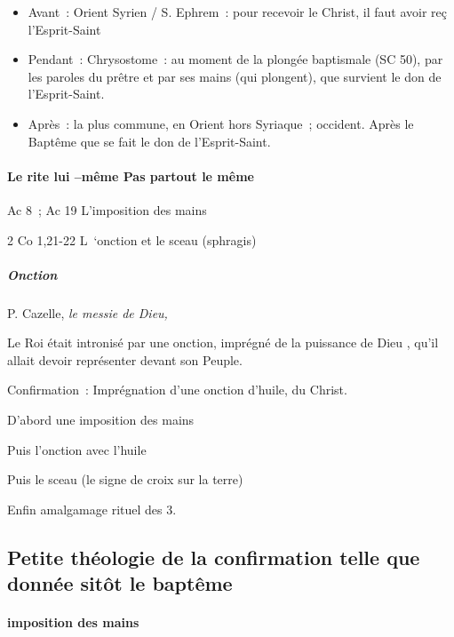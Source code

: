 \begin{itemize}
\item
  Avant~: Orient Syrien / S. Ephrem~: pour recevoir le Christ, il faut
  avoir reç l'Esprit-Saint
\item
  Pendant~: Chrysostome~: au moment de la plongée baptismale (SC 50),
  par les paroles du prêtre et par ses mains (qui plongent), que
  survient le don de l'Esprit-Saint.
\item
  Après~: la plus commune, en Orient hors Syriaque~; occident. Après le
  Baptême que se fait le don de l'Esprit-Saint.
\end{itemize}

\hypertarget{le-rite-lui-muxeame-pas-partout-le-muxeame}{%
\paragraph{Le rite lui --même Pas partout le
même}\label{le-rite-lui-muxeame-pas-partout-le-muxeame}}

Ac 8~; Ac 19 L'imposition des mains

 
2 Co 1,21-22 L~`onction et le sceau (sphragis)
 

\hypertarget{onction}{%
\subparagraph{Onction}\label{onction}}

P. Cazelle, \emph{le messie de Dieu,}

Le Roi était intronisé par une onction, imprégné de la puissance de Dieu
, qu'il allait devoir représenter devant son Peuple.

Confirmation~: Imprégnation d'une onction d'huile, du Christ.

D'abord une imposition des mains

Puis l'onction avec l'huile

Puis le sceau (le signe de croix sur la terre)

Enfin amalgamage rituel des 3.

\hypertarget{petite-thuxe9ologie-de-la-confirmation-telle-que-donnuxe9e-situxf4t-le-baptuxeame}{%
\subsection{Petite théologie de la confirmation telle que donnée
sitôt le
baptême}\label{petite-thuxe9ologie-de-la-confirmation-telle-que-donnuxe9e-situxf4t-le-baptuxeame}}

\hypertarget{a.-imposition-des-mains}{%
\paragraph{imposition des mains}\label{a.-imposition-des-mains}}

